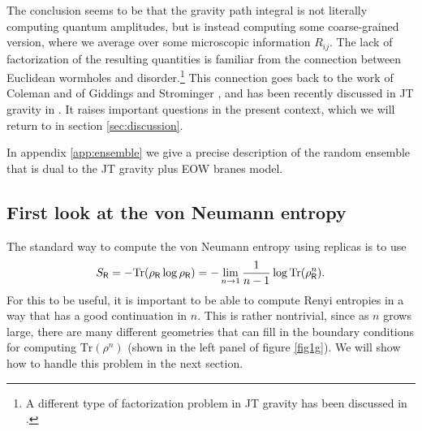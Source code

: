 \documentclass[12pt]{article}
\newcommand{\be}{\begin{equation}}
\newcommand{\ee}{\end{equation}}
\numberwithin{equation}{section}
\def\tr{\text{Tr}}
\begin{document}
The conclusion seems to be that the gravity path integral is not literally computing quantum amplitudes, but is instead computing some coarse-grained version, where we average over some microscopic information $R_{ij}$. The lack of factorization of the resulting quantities is familiar from the connection between Euclidean wormholes and disorder.\footnote{A different type of factorization problem in JT gravity has been discussed in \cite{Harlow:2018tqv,Lin:2018xkj,Jafferis:2019wkd}.} This connection goes back to the work of  Coleman \cite{Coleman:1988cy} and of Giddings and Strominger \cite{Giddings:1988cx}, and has been recently discussed in JT gravity in \cite{Saad:2019lba}. It raises important questions in the present context, which we will return to in section \ref{sec:discussion}.

In appendix \ref{app:ensemble} we give a precise description of the random ensemble that is dual to the JT gravity plus EOW branes model.


\subsection{First look at the von Neumann entropy}
The standard way to compute the von Neumann entropy using replicas is to use
\be
S_{\sf{R}} = -\tr(\rho_{\sf{R}}\log\rho_{\sf{R}})= -\lim_{n\to 1}\frac{1}{n-1}\log\tr(\rho_{\sf{R}}^n).
\ee
For this to be useful, it is important to be able to compute Renyi entropies in a way that has a good continuation in $n$. This is rather nontrivial, since as $n$ grows large, there are many different geometries that can fill in the boundary conditions for computing $\tr(\rho^n)$ (shown in the left panel of figure \ref{fig1g}). We will show how to handle this problem in the next section.
\end{document}
